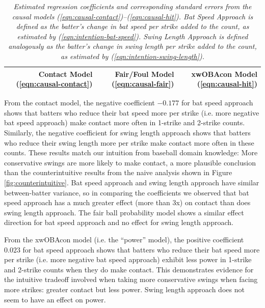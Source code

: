 \documentclass{article}
\begin{document}
      \begin{table}
        \centering
        \begin{tabular}{l|r|r|r|}
          & Contact Model (\ref{eqn:causal-contact}) & Fair/Foul Model (\ref{eqn:causal-fair}) & xwOBAcon Model (\ref{eqn:causal-hit})\\
          \hline
          
        \end{tabular}
        \caption{\it Estimated regression coefficients and corresponding standard errors from the causal models (\ref{eqn:causal-contact})--(\ref{eqn:causal-hit}). Bat Speed Approach is defined as the batter's change in bat speed per strike added to the count, as estimated by (\ref{eqn:intention-bat-speed}). Swing Length Approach is defined analogously as the batter's change in swing length per strike added to the count, as estimated by (\ref{eqn:intention-swing-length}).}
        \label{tab:causal-model}
      \end{table}

      From the contact model, the negative coefficient $-0.177$ for bat speed approach shows that batters who reduce their bat speed more per strike (i.e. more negative bat speed approach) make contact more often in 1-strike and 2-strike counts. Similarly, the negative coefficient for swing length approach shows that batters who reduce their swing length more per strike make contact more often in these counts. These results match our intuition from baseball domain knowledge: More conservative swings are more likely to make contact, a more plausible conclusion than the counterintuitive results from the naive analysis shown in Figure \ref{fig:counterintuitive}. Bat speed approach and swing length approach have similar between-batter variance, so in comparing the coefficients we observed that bat speed approach has a much greater effect (more than 3x) on contact than does swing length approach. The fair ball probability model shows a similar effect direction for bat speed approach and no effect for swing length approach.

      From the xwOBAcon model (i.e. the ``power'' model), the positive coefficient $0.023$ for bat speed approach shows that batters who reduce their bat speed more per strike (i.e. more negative bat speed approach) exhibit less power in 1-strike and 2-strike counts when they do make contact. This demonstrates evidence for the intuitive tradeoff involved when taking more conservative swings when facing more strikes: greater contact but less power. Swing length approach does not seem to have an effect on power.
\end{document}
